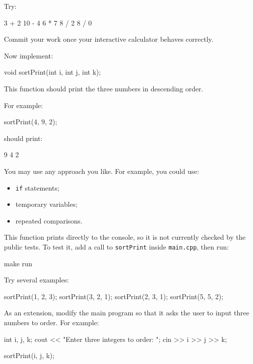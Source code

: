 \documentclass{csc2059practical}
\begin{document}
Try:

\begin{terminal}
3 + 2
10 - 4
6 * 7
8 / 2
8 / 0
\end{terminal}

Commit your work once your interactive calculator behaves correctly.


Now implement:

\begin{cppcode}
void sortPrint(int i, int j, int k);
\end{cppcode}

This function should print the three numbers in descending order.

For example:

\begin{cppcode}
sortPrint(4, 9, 2);
\end{cppcode}

should print:

\begin{terminal}
9 4 2
\end{terminal}

You may use any approach you like. For example, you could use:

\begin{itemize}
  \item \texttt{if} statements;
  \item temporary variables;
  \item repeated comparisons.
\end{itemize}

This function prints directly to the console, so it is not currently checked by the public tests. To test it, add a call to \texttt{sortPrint} inside \texttt{main.cpp}, then run:

\begin{bashcode}
make run
\end{bashcode}

Try several examples:

\begin{cppcode}
sortPrint(1, 2, 3);
sortPrint(3, 2, 1);
sortPrint(2, 3, 1);
sortPrint(5, 5, 2);
\end{cppcode}

\Needspace{70mm}
As an extension, modify the main program so that it asks the user to input three numbers to order. For example:

\begin{cppcode}
int i, j, k;
cout << "Enter three integers to order: ";
cin >> i >> j >> k;

sortPrint(i, j, k);
\end{cppcode}
\end{document}
